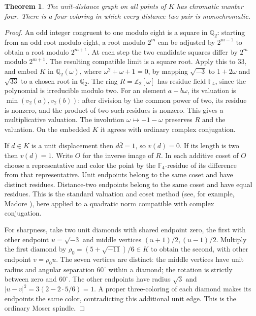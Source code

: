 \documentclass[11pt,letterpaper]{article}
\newtheorem{theorem}{Theorem}
\begin{document}
\begin{theorem}
The unit-distance graph on all points of \(K\) has chromatic number
four. There is a four-coloring in which every distance-two pair is
monochromatic.
\end{theorem}
\begin{proof}
An odd integer congruent to one modulo eight is a square in
\(\mathbb Q_2\): starting from an odd root modulo eight, a root
modulo \(2^m\) can be adjusted by \(2^{m-1}\) to obtain a root
modulo \(2^{m+1}\). At each step the two candidate squares differ
by \(2^m\) modulo \(2^{m+1}\). The resulting compatible limit is a
square root. Apply this to 33, and embed \(K\) in
\(\mathbb Q_2(\omega)\), where \(\omega^2+\omega+1=0\), by mapping
\(\sqrt{-3}\) to \(1+2\omega\) and \(\sqrt{33}\) to a chosen
root in \(\mathbb Q_2\). The ring \(R=\mathbb Z_2[\omega]\) has
residue field \(\mathbb F_4\), since the polynomial is irreducible
modulo two. For an element \(a+b\omega\), its valuation is
\(\min(v_2(a),v_2(b))\): after division by the common power of
two, its residue is nonzero, and the product of two such residues
is nonzero. This gives a multiplicative valuation. The involution
\(\omega\mapsto-1-\omega\) preserves \(R\) and the valuation.
On the embedded \(K\) it agrees with ordinary complex conjugation.

If \(d\in K\) is a unit displacement then \(d\overline d=1\),
so \(v(d)=0\). If its length is two then \(v(d)=1\).
Write \(O\) for the inverse image of \(R\). In each additive coset
of \(O\) choose a representative and color the point by the
\(\mathbb F_4\)-residue of its difference from that representative.
Unit endpoints belong to the same coset and have distinct residues.
Distance-two endpoints belong to the same coset and have equal
residues. This is the standard valuation and coset method
(see, for example, Madore \cite[Prop.~3.2]{madore}), here applied
to a quadratic norm compatible with complex conjugation.

For sharpness, take two unit diamonds with shared endpoint zero,
the first with other endpoint \(u=\sqrt{-3}\) and middle vertices
\((u+1)/2,(u-1)/2\). Multiply the first diamond by
\(\rho_0=(5+\sqrt{-11})/6\in K\) to obtain the second, with other
endpoint \(v=\rho_0u\). The seven vertices are distinct:
the middle vertices have unit radius and angular separation
\(60^\circ\) within a diamond; the rotation is strictly between
zero and \(60^\circ\). The other endpoints have radius
\(\sqrt3\) and \(|u-v|^2=3(2-2\cdot5/6)=1\).
A proper three-coloring of each diamond makes its endpoints
the same color, contradicting this additional unit edge. This
is the ordinary Moser spindle.
\end{proof}
\end{document}
